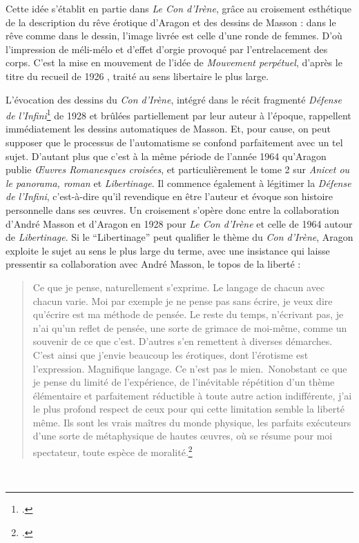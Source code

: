 Cette idée s’établit en partie dans \emph{Le Con d’Irène}, grâce au croisement esthétique de la description du rêve érotique d’Aragon et des dessins de Masson : dans le rêve comme dans le dessin, l’image livrée est celle d’une ronde de femmes. D’où l’impression de méli-mélo et d’effet d’orgie provoqué par l’entrelacement des corps. C’est la mise en mouvement de l’idée de \emph{Mouvement perpétuel}, d’après le titre du recueil de  1926 , traité au sens libertaire le plus large.


L’évocation des dessins du \emph{Con d’Irène}, intégré dans le récit fragmenté \emph{Défense de l’Infini}\footcite{defense} de 1928 et brûlées partiellement par leur auteur à l’époque, rappellent immédiatement les dessins automatiques de Masson. Et, pour cause, on peut supposer que le processus de l’automatisme se confond parfaitement avec un tel sujet. D’autant plus que c’est à la même période de l’année 1964 qu’Aragon publie \emph{\OE{}uvres Romanesques croisées}, et particulièrement le tome 2 sur \emph{Anicet ou le panorama, roman} et \emph{Libertinage}. Il commence également à légitimer la \emph{Défense de l’Infini}, c’est-à-dire qu’il revendique en être l’auteur et évoque son histoire personnelle dans ses \oe{}uvres. Un croisement s’opère donc entre la collaboration d’André Masson et d’Aragon en 1928 pour \emph{Le Con d’Irène} et celle de 1964 autour de \emph{Libertinage}. Si le  \enquote{Libertinage} peut qualifier le thème du \emph{Con d’Irène}, Aragon exploite le sujet au sens le plus large du terme, avec une insistance qui laisse pressentir sa collaboration avec André Masson, le topos de la liberté : 

\begin{quote}
Ce que je pense, naturellement s’exprime. Le langage de chacun avec chacun varie. Moi par exemple je ne pense pas sans écrire, je veux dire qu’écrire est ma méthode de pensée. Le reste du temps, n’écrivant pas, je n’ai qu’un reflet de pensée, une sorte de grimace de moi-même, comme un souvenir de ce que c’est. D’autres s’en remettent à diverses démarches. C’est ainsi que j’envie beaucoup les érotiques, dont l’érotisme est l’expression. Magnifique langage. Ce n’est pas le mien. Nonobstant ce que je pense du limité de l’expérience, de l’inévitable répétition d’un thème élémentaire et parfaitement réductible à toute autre action indifférente, j’ai le plus profond respect de ceux pour qui cette limitation semble la liberté même. Ils sont les vrais maîtres du monde physique, les parfaits exécuteurs d’une sorte de métaphysique de hautes \oe{}uvres, où se résume pour moi spectateur, toute espèce de moralité.\footcite[p266]{defense}	
\end{quote}
 


